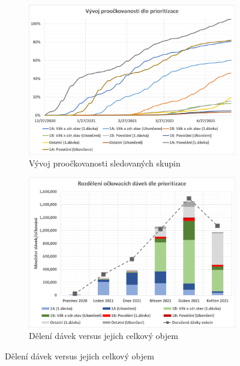 \begin{figure}
\centering

\begin{subfigure}{0.45\textwidth}
\includegraphics[width=\textwidth]{assets/gr_proockovanost}
\caption{Vývoj proočkovanosti sledovaných skupin}
\label{gr_proockovanost}
\end{subfigure}
%
\begin{subfigure}{0.45\textwidth}
\includegraphics[width=\textwidth]{assets/gr_mesice}
\caption{Dělení dávek versus jejich celkový objem}
\label{gr_skupiny_davky}
\end{subfigure}



\end{figure}
